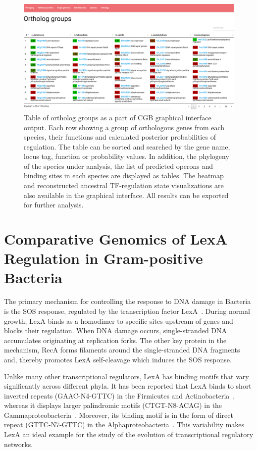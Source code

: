 \begin{figure}
  \centering
  \includegraphics[width=\textwidth]{figures/chapter4/output}
  \caption{Table of ortholog groups as a part of CGB graphical interface
    output. Each row showing a group of orthologous genes from each species,
    their functions and calculated posterior probabilities of regulation. The
    table can be sorted and searched by the gene name, locus tag, function or
    probability values. In addition, the phylogeny of the species under
    analysis, the list of predicted operons and binding sites in each species
    are displayed as tables. The heatmap and reconstructed ancestral
    TF-regulation state visualizations are also available in the graphical
    interface. All results can be exported for further analysis.}
  \label{fig:gui-output}
\end{figure}

\section{Comparative Genomics of LexA Regulation in Gram-positive Bacteria}

The primary mechanism for controlling the response to DNA damage in Bacteria is
the SOS response, regulated by the transcription factor
LexA~\citep{radman1975sos, erill2007aeons, michel2005after}. During normal
growth, LexA binds as a homodimer to specific sites upstream of genes and
blocks their regulation. When DNA damage occurs, single-stranded DNA
accumulates originating at replication forks. The other key protein in the
mechanism, RecA forms filaments around the single-stranded DNA fragments and,
thereby promotes LexA self-cleavage which induces the SOS response.

Unlike many other transcriptional regulators, LexA has binding motifs that vary
significantly across different phyla. It has been reported that LexA binds to
short inverted repeats (GAAC-N4-GTTC) in the Firmicutes and
Actinobacteria~\citep{au2005genetic, davis2002definition}, whereas it displays
larger palindromic motifs (CTGT-N8-ACAG) in the
Gammaproteobacteria~\citep{erill2003silico,
  fernandez2000identification}. Moreover, its binding motif is in the form of
direct repeat (GTTC-N7-GTTC) in the
Alphaproteobacteria~\citep{erill2004differences, fernandez1998identification}.
This variability makes LexA an ideal example for the study of the evolution
of transcriptional regulatory networks.


